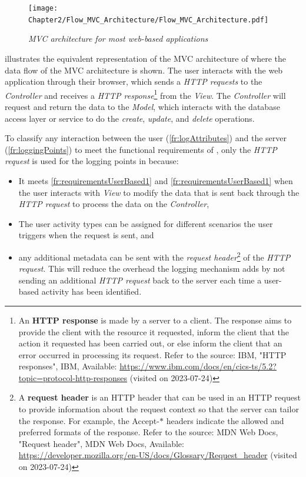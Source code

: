 \begin{figure}[!htb]
	\centering %
	\texttt{[image: Chapter2/Flow\_MVC\_Architecture/Flow\_MVC\_Architecture.pdf]}
	\caption[MVC architecture for most web-based applications]
	{\textit{MVC architecture for most web-based applications \cite{Gu2010}}}\label{fig:ch2_flowMVC_Architecture}
\end{figure}

 illustrates the equivalent representation of the MVC architecture of  where the data flow of the MVC architecture is shown. The user interacts with the web application through their browser, which sends a \textit{HTTP requests} to the \textit{Controller} and receives a \textit{HTTP response}\footnote{An \textbf{HTTP response} is made by a server to a client. The response aims to provide the client with the resource it requested, inform the client that the action it requested has been carried out, or else inform the client that an error occurred in processing its request. Refer to the source: IBM, "HTTP responses", IBM, Available: \url{https://www.ibm.com/docs/en/cics-ts/5.2?topic=protocol-http-responses} (visited on 2023-07-24)} from the \textit{View}. The \textit{Controller} will request and return the data to the \textit{Model}, which interacts with the database access layer or service to do the \textit{create}, \textit{update}, and \textit{delete} operations. \par To classify any interaction between the user (\ref{fr:logAttributes}) and the server (\ref{fr:loggingPoints}) to meet the functional requirements of , only the \textit{HTTP request} is used for the logging points in  because:

\begin{itemize}
	\item It meets \ref{fr:requirementsUserBased1} and \ref{fr:requirementsUserBased1} when the user interacts with \textit{View} to modify the data that is sent back through the \textit{HTTP request} to process the data on the \textit{Controller},
	\item The user activity types can be assigned for different scenarios the user triggers when the request is sent, and 
	\item any additional metadata can be sent with the \textit{request header}\footnote{A \textbf{request header} is an HTTP header that can be used in an HTTP request to provide information about the request context so that the server can tailor the response. For example, the Accept-$\ast$ headers indicate the allowed and preferred formats of the response. Refer to the source: MDN Web Docs, "Request header", MDN Web Docs, Available: \url{https://developer.mozilla.org/en-US/docs/Glossary/Request_header} (visited on 2023-07-24)} of the \textit{HTTP request}. This will reduce the overhead the logging mechanism adds by not sending an additional \textit{HTTP request} back to the server each time a user-based activity has been identified.
\end{itemize}

